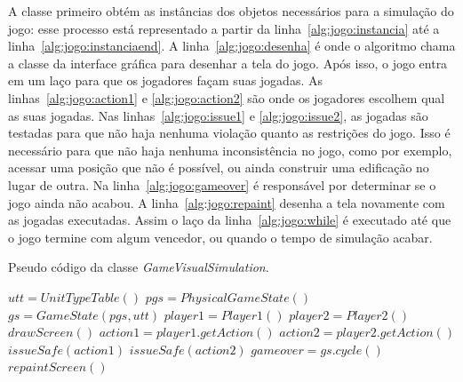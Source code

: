 A classe primeiro obtém as instâncias dos objetos necessários para a simulação do jogo: esse processo está representado a partir da linha~\ref{alg:jogo:instancia} até a linha~\ref{alg:jogo:instanciaend}.
A linha~\ref{alg:jogo:desenha} é onde o algoritmo chama a classe da interface gráfica para desenhar a tela do jogo.
Após isso, o jogo entra em um laço para que os jogadores façam suas jogadas. As linhas~\ref{alg:jogo:action1} e \ref{alg:jogo:action2} são onde os jogadores escolhem qual as suas jogadas.
Nas linhas~\ref{alg:jogo:issue1} e \ref{alg:jogo:issue2}, as jogadas são testadas para que não haja nenhuma violação quanto as restrições do jogo.
Isso é necessário para que não haja nenhuma inconsistência no jogo, como por exemplo, acessar uma posição que não é possível, ou ainda construir uma edificação no lugar de outra.
Na linha~\ref{alg:jogo:gameover} é responsável por determinar se o jogo ainda não acabou.
A linha~\ref{alg:jogo:repaint} desenha a tela novamente com as jogadas executadas.
Assim o laço da linha~\ref{alg:jogo:while} é executado até que o jogo termine com algum vencedor, ou quando o tempo de simulação acabar.

\begin{algorithm}
	\caption{Pseudo código da classe \textit{GameVisualSimulation}.}
	\label{alg:jogo}
	\begin{algorithmic}[1]		
		\State $utt = UnitTypeTable()$ \label{alg:jogo:instancia}
		\State $pgs = PhysicalGameState()$
		\State $gs = GameState(pgs, utt)$
		\State $player1 = Player1()$
		\State $player2 = Player2()$ \label{alg:jogo:instanciaend}
		\State $drawScreen()$  \label{alg:jogo:desenha}
		 \label{alg:jogo:while}
			\State $action1 = player1.getAction()$ \label{alg:jogo:action1}
			\State $action2 = player2.getAction()$ \label{alg:jogo:action2}
			\State $issueSafe(action1)$ \label{alg:jogo:issue1}
			\State $issueSafe(action2)$ \label{alg:jogo:issue2}
			\State $gameover = gs.cycle()$ \label{alg:jogo:gameover} 
			\State $repaintScreen()$ \label{alg:jogo:repaint}
		\EndWhile
		\EndFunction
	\end{algorithmic}
\end{algorithm}

